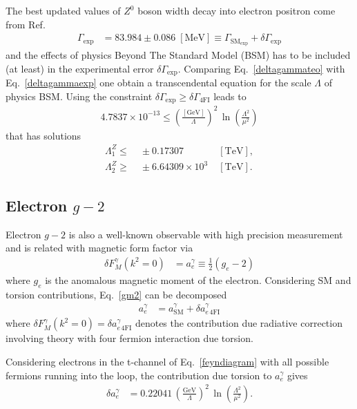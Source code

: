 The best updated values of $Z^0$ boson width decay into electron positron come from Ref.~\cite{Beringer:1900zz}
\begin{align}
\label{deltagammaexp}
 \Gamma_{\text{exp}} &= 83.984 \pm 0.086\;[\text{MeV}] \equiv \Gamma_{\text{SM}_\text{exp}} + \delta\Gamma_{\text{exp}}
\end{align}
and the effects of physics Beyond The Standard Model (BSM) has to be included (at least) in the experimental error $\delta\Gamma_{\text{exp}}$. Comparing Eq.~\eqref{deltagammateo} with Eq.~\eqref{deltagammaexp} one obtain a transcendental equation for the scale $\Lambda$ of physics BSM. Using the constraint $\delta\Gamma_{\text{exp}} \geq \delta\Gamma_{\text{4FI}}$ leads to
\begin{align}
4.7837\times10^{-13}\leq\left(\frac{[\text{GeV}]}{\Lambda}\right)^2\,\ln\left(\frac{\Lambda^2}{\mu^2}\right)
\end{align}
that has solutions
\begin{eqnarray}
 \label{lowscalefromz}
 \Lambda_1^{Z} \leq&\; \pm0.17307\;&[\text{TeV}], \\
 \label{upscalefromz}
 \Lambda_2^{Z} \geq&\; \pm6.64309\times10^3\;&[\text{TeV}].
\end{eqnarray}

\subsection{Electron $g-2$}

Electron $g-2$ is also a well-known observable with high precision measurement and is related with magnetic form factor via
\begin{align}
\label{gm2}
\delta F_M^\gamma(k^2=0) &= a_e^\gamma \equiv \frac{1}{2}\left(g_e-2\right)
\end{align}
where $g_e$ is the anomalous magnetic moment of the electron. Considering SM and torsion contributions, Eq.~\eqref{gm2} can be decomposed
\begin{align}
a_e^\gamma &= a_{\text{SM}}^\gamma + \delta a_{e\,\text{4FI}}^\gamma
\end{align}
where $\delta F_M^\gamma(k^2=0) = \delta a_{e\,\text{4FI}}^\gamma$ denotes the contribution due radiative correction involving theory with four fermion interaction due torsion. 

Considering electrons in the t-channel of Eq.~\eqref{feyndiagram} with all possible fermions running into the loop, the contribution due torsion to $a_e^\gamma$ gives
\begin{align}
\label{aeteo}
 \delta a_e^\gamma &= 0.22041\,\left(\frac{\text{GeV}}{\Lambda}\right)^2\,\ln\left(\frac{\Lambda^2}{\mu^2}\right).
\end{align}

